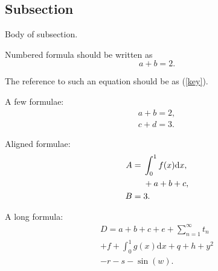 \documentclass{procDDs}
\begin{document}
\begin{table}[!ht]
	\label{table:name11}
	\end{table}
 
\subsection{Subsection}

Body of subsection.

Numbered formula should be written as
\begin{equation}\label{key}                       %
a+b=2.                                         %
\end{equation}

The reference to such an equation should be as (\ref{key}).

A few formulae:
\begin{gather}                       %
a+b=2,\label{key1}\\
c+d=3.\label{key2}
\end{gather}


Aligned formulae:
\begin{align}                       %
A={}&\int_0^1f(x)\mathrm{d}x,\notag\\
&{}+a+b+c,\label{key3}\\
B={}&3.\label{key4}
\end{align}

A long formula:
\begin{multline}
D=a+b+c+e+\sum_{n=1}^\infty t_n\\
+f+\int_0^1g(x)\mathrm{d}x+q+h+y^2\\
-r-s-\sin(w).
\end{multline}
 
\end{document}
